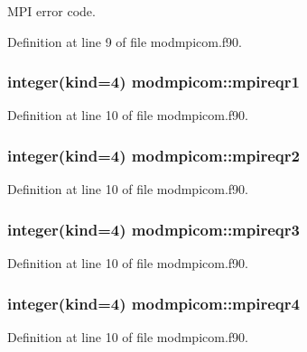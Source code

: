 M\-P\-I error code. 



Definition at line 9 of file modmpicom.\-f90.

\hypertarget{classmodmpicom_ac22bfba3e611102e10fdfd1de038f25f}{
\subsubsection[{mpireqr1}]{\setlength{\rightskip}{0pt plus 5cm}integer(kind=4) modmpicom\-::mpireqr1}}\label{classmodmpicom_ac22bfba3e611102e10fdfd1de038f25f}


Definition at line 10 of file modmpicom.\-f90.

\hypertarget{classmodmpicom_a825f1ba2f76e8ca1c71b11f4e7b29815}{
\subsubsection[{mpireqr2}]{\setlength{\rightskip}{0pt plus 5cm}integer(kind=4) modmpicom\-::mpireqr2}}\label{classmodmpicom_a825f1ba2f76e8ca1c71b11f4e7b29815}


Definition at line 10 of file modmpicom.\-f90.

\hypertarget{classmodmpicom_a3d9bf986389786c043540894df1ad003}{
\subsubsection[{mpireqr3}]{\setlength{\rightskip}{0pt plus 5cm}integer(kind=4) modmpicom\-::mpireqr3}}\label{classmodmpicom_a3d9bf986389786c043540894df1ad003}


Definition at line 10 of file modmpicom.\-f90.

\hypertarget{classmodmpicom_a7a50a2ea228f57406a2f246a57016fa9}{
\subsubsection[{mpireqr4}]{\setlength{\rightskip}{0pt plus 5cm}integer(kind=4) modmpicom\-::mpireqr4}}\label{classmodmpicom_a7a50a2ea228f57406a2f246a57016fa9}


Definition at line 10 of file modmpicom.\-f90.

